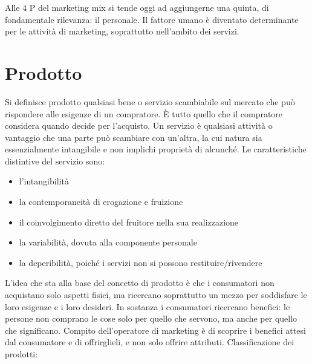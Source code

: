 Alle 4 P del marketing mix si tende oggi ad  aggiungerne una quinta, di fondamentale rilevanza: il personale. Il fattore umano è diventato determinante per le attività di marketing, soprattutto nell'ambito dei servizi. 

\section{Prodotto}
Si definisce prodotto qualsiasi bene o servizio scambiabile sul mercato che può rispondere alle esigenze di un compratore. È tutto quello che il compratore considera quando decide per l’acquisto. \newline
Un servizio è qualsiasi attività o vantaggio che una parte può scambiare con un’altra, la cui natura sia essenzialmente intangibile e non implichi proprietà di alcunché. \newline
Le caratteristiche distintive del servizio sono:
\begin{itemize}
	\item l’intangibilità
	\item la contemporaneità di erogazione e fruizione
	\item il coinvolgimento diretto del fruitore nella sua realizzazione
	\item la variabilità, dovuta alla componente personale
	\item la deperibilità, poiché i servizi non si possono restituire/rivendere
\end{itemize}
L’idea che sta alla base del concetto di prodotto è che i consumatori non acquistano solo aspetti fisici, ma ricercano soprattutto un mezzo per soddisfare le loro esigenze e i loro desideri. In sostanza i consumatori ricercano benefici: le persone non comprano le cose solo per quello che servono, ma anche per quello che significano. \newline
Compito dell’operatore di marketing è di scoprire i benefici attesi dal consumatore e di offrirglieli, e non solo offrire attributi. \newline
Classificazione dei prodotti:
